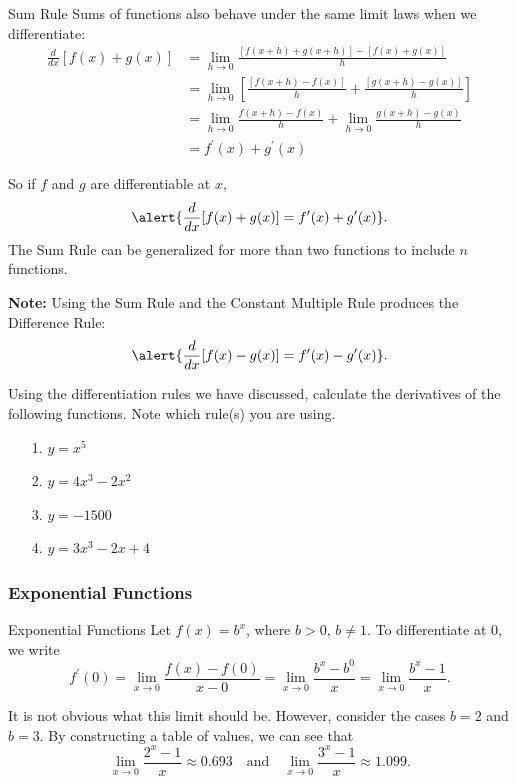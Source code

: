 \documentclass[cal1spr16Lectures.tex]{subfiles}
\begin{document}
\begin{frame}{\small Sum Rule}
Sums of functions also behave under the same limit laws when we differentiate:
\begin{align*}
\frac{d}{dx}[f(x)+g(x)] &= \lim_{h \to 0} \frac{[f(x+h)+g(x+h)]-[f(x)+g(x)]}{h} \\
&= \lim_{h \to 0} \left[\frac{[f(x+h)-f(x)]}{h}+\frac{[g(x+h)-g(x)]}{h}\right] \\[0.25pc]
&= \lim_{h \to 0} \frac{f(x+h)-f(x)}{h}+ \lim_{h \to 0}\frac{g(x+h)-g(x)}{h} \\[0.25pc]
&= f^{\prime}(x)+g^{\prime}(x)
\end{align*}
\end{frame}

\begin{frame}{}
So if $f$ and $g$ are differentiable at $x$,
\[\alert{\frac{d}{dx}[f(x)+g(x)]=f^{\prime}(x)+g^{\prime}(x)}.\]
The Sum Rule can be generalized for more than two functions to include $n$ functions.

\vspace{1pc}
{\bf Note:}  Using the Sum Rule and the Constant Multiple Rule produces the Difference Rule:
\[\alert{\frac{d}{dx}[f(x)-g(x)]=f^{\prime}(x)-g^{\prime}(x)}.\]
\end{frame}

\begin{frame}
\begin{exe}Using the differentiation rules we have discussed, calculate the derivatives of the following functions.  Note which rule(s) you are using.
\begin{itemize}
\item[1.] $y=x^5$
\item[2.] $y=4x^3-2x^2$
\item[3.] $y=-1500$
\item[4.] $y=3x^3-2x+4$
\end{itemize}
\end{exe}
\end{frame}

\subsubsection{Exponential Functions}

\begin{frame}{\small Exponential Functions}\footnotesize
Let $f(x)=b^x$, where $b>0$, $b \neq 1$.  To differentiate at $0$, we write
\[f^{\prime}(0)=\lim_{x \to 0}\frac{f(x)-f(0)}{x-0}=\lim_{x \to 0} \frac{b^x-b^0}{x}=
\lim_{x \to 0} \frac{b^x-1}{x}.\]

\vspace{1pc}
It is not obvious what this limit should be.  However, consider the cases $b=2$ and $b=3$.  By constructing a table of values, we can see that 
\[\lim_{x \to 0} \frac{2^x-1}{x} \approx 0.693 \quad \text{and}\quad \lim_{x \to 0} \frac{3^x-1}{x} \approx 1.099.\]
\end{frame}
\end{document}
